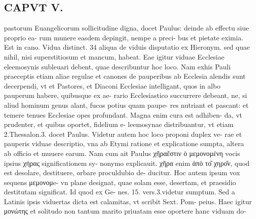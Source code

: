 \documentclass{article}
\begin{document}
\begin{pages}
\section*{CAPVT  V. }
\marginpar{[ p.257 ]}\pstart pastorum Euangelicorum sollicitudine digna, docet Paulus: deinde ab effectu siue proprio ea- rum munere easdem depingit, nempe a preci- bus et pietate eximia. Est in cano. Vidua distinct. 34 aliqua de viduis disputatio ex Hieronym. sed quae nihil, nisi superstitiosum et mancum, habeat. Eae igitur viduae Ecclesiae eleemosynis subleuari debent, quae describuntur hoc loco. Nam exhis Pauli praeceptis etiam aliae regulae et canones de pauperibus ab Ecclesia alendis sunt decerpendi, vt et Pastores, et Diaconi Ecclesiae intelligant, quos in albo pauperum habere, quibusque ex ae- rario Ecclesiastico succurrere debeant, ne, si aliud hominum genus alant, fucos potius quam paupe- res nutriant et pascant: et temere tenues Ecclesiae opes profundant. Magna enim cura est adhiben- da, vt prudenter, et quibus oportet, fidelium e- leemosynae distribuantur, vt etiam 2.Thessalon.3. docet Paulus. Videtur autem hoc loco proponi duplex ve- rae et pauperis viduae descriptio, vna ab Etymi ratione et explicatione sumpta, altera ab officio et muuere earum. Nam cum ait Paulus χῆραἔστιν ὸ μεμονομένη vocis ipsius χήρας significationem sy- nonymo explicauit. χῆρα enim ἀπὸ το͂ χηρο͂ν, quod est desolare, destituere, orbare proculdubio de- ducitur. Hoc autem ipsum vox sequens μεμονομe- vn plane designat, quae solam esse, desertam, et praesidio destitutam significat. Id quod ex Ge- nes. 15. vers.3.videtur sumptum. Sed a Latinis ipsis viduertas dicta est calamitas, vt scribit Sext. Pom- peius. Haec igitur μονώτης et solitudo non tantum marito priuatam esse oportere hanc viduam do-  \pend

\end{pages}
\end{document}
